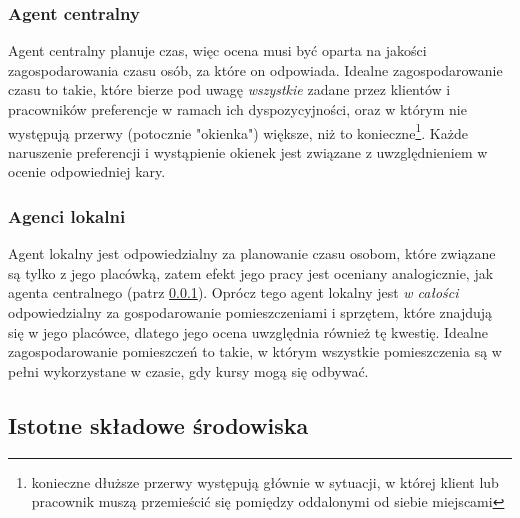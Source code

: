 \subsubsection{Agent centralny}\label{sssec:miaraWynikowCentralny}
Agent centralny planuje czas, więc ocena musi być oparta na jakości zagospodarowania czasu osób,
za które on odpowiada. Idealne zagospodarowanie czasu to takie, które bierze pod uwagę \emph{wszystkie}
zadane przez klientów i pracowników preferencje w ramach ich dyspozycyjności, oraz w którym nie
występują przerwy (potocznie "{okienka}") większe, niż to konieczne\footnote{konieczne dłuższe przerwy
występują głównie w sytuacji, w której klient lub pracownik muszą przemieścić się
pomiędzy oddalonymi od siebie miejscami}. Każde naruszenie preferencji i wystąpienie okienek jest
związane z uwzględnieniem w ocenie odpowiedniej kary.

\subsubsection{Agenci lokalni}\label{sssec:miaraWynikowLokalny}
Agent lokalny jest odpowiedzialny za planowanie czasu osobom, które związane są tylko z jego placówką,
zatem efekt jego pracy jest oceniany analogicznie, jak agenta centralnego (patrz \ref{sssec:miaraWynikowCentralny}).
Oprócz tego agent lokalny jest \emph{w całości} odpowiedzialny za gospodarowanie pomieszczeniami i sprzętem,
które znajdują się w jego placówce, dlatego jego ocena uwzględnia również tę kwestię.
Idealne zagospodarowanie pomieszczeń to takie, w którym wszystkie pomieszczenia są w pełni wykorzystane
w czasie, gdy kursy mogą się odbywać.



\subsection{Istotne składowe środowiska}

